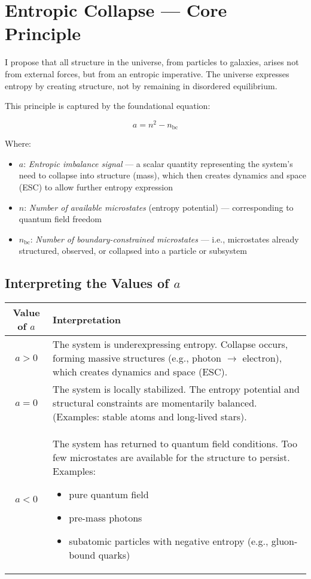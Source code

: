 \documentclass[12pt]{article}
\begin{document}
\newpage

\section{Entropic Collapse — Core Principle}

I propose that all structure in the universe, from particles to galaxies, arises not from external forces, but from an entropic imperative. The universe expresses entropy by creating structure, not by remaining in disordered equilibrium.

This principle is captured by the foundational equation:

\[
a = n^2 - n_{\text{bc}}
\]

\noindent
Where:

\begin{itemize}
    \item $a$: \textit{Entropic imbalance signal} — a scalar quantity representing the system’s need to collapse into structure (mass), which then creates dynamics and space (ESC) to allow further entropy expression
    \item $n$: \textit{Number of available microstates} (entropy potential) — corresponding to quantum field freedom
    \item $n_{\text{bc}}$: \textit{Number of boundary-constrained microstates} — i.e., microstates already structured, observed, or collapsed into a particle or subsystem
\end{itemize}

\subsection{Interpreting the Values of $a$}

\begin{center}
\begin{tabular}{|c|p{10cm}|}
\hline
\textbf{Value of $a$} & \textbf{Interpretation} \\
\hline
$a > 0$ & The system is underexpressing entropy. Collapse occurs, forming massive structures (e.g., photon $\rightarrow$ electron), which creates dynamics and space (ESC). \\
\hline
$a = 0$ & The system is locally stabilized. The entropy potential and structural constraints are momentarily balanced. (Examples: stable atoms and long-lived stars). \\
\hline
$a < 0$ & The system has returned to quantum field conditions. Too few microstates are available for the structure to persist. Examples:
\begin{itemize}
    \item pure quantum field
    \item pre-mass photons
    \item subatomic particles with negative entropy (e.g., gluon-bound quarks)
\end{itemize} \\
\hline
\end{tabular}
\end{center}
\end{document}
